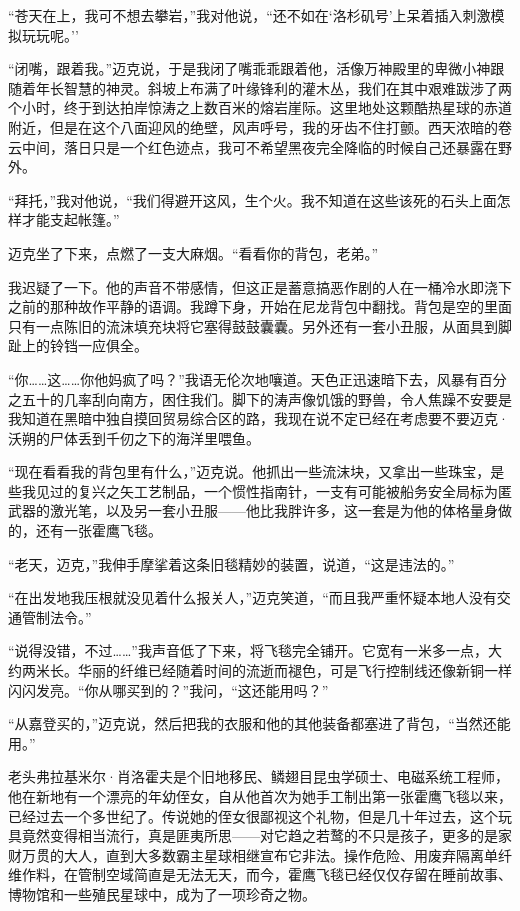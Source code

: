 \documentclass[AutoFakeBold=true]{book}
\begin{document}
``苍天在上，我可不想去攀岩，''我对他说，``还不如在`洛杉矶号'上呆着插入刺激模拟玩玩呢。''

``闭嘴，跟着我。''迈克说，于是我闭了嘴乖乖跟着他，活像万神殿里的卑微小神跟随着年长智慧的神灵。斜坡上布满了叶缘锋利的灌木丛，我们在其中艰难跋涉了两个小时，终于到达拍岸惊涛之上数百米的熔岩崖际。这里地处这颗酷热星球的赤道附近，但是在这个八面迎风的绝壁，风声呼号，我的牙齿不住打颤。西天浓暗的卷云中间，落日只是一个红色迹点，我可不希望黑夜完全降临的时候自己还暴露在野外。

``拜托，''我对他说，``我们得避开这风，生个火。我不知道在这些该死的石头上面怎样才能支起帐篷。''

迈克坐了下来，点燃了一支大麻烟。``看看你的背包，老弟。''

我迟疑了一下。他的声音不带感情，但这正是蓄意搞恶作剧的人在一桶冷水即浇下之前的那种故作平静的语调。我蹲下身，开始在尼龙背包中翻找。背包是空的里面只有一点陈旧的流沫填充块将它塞得鼓鼓囊囊。另外还有一套小丑服，从面具到脚趾上的铃铛一应俱全。

``你……这……你他妈疯了吗？''我语无伦次地嚷道。天色正迅速暗下去，风暴有百分之五十的几率刮向南方，困住我们。脚下的涛声像饥饿的野兽，令人焦躁不安要是我知道在黑暗中独自摸回贸易综合区的路，我现在说不定已经在考虑要不要迈克·沃朔的尸体丢到千仞之下的海洋里喂鱼。

``现在看看我的背包里有什么，''迈克说。他抓出一些流沫块，又拿出一些珠宝，是些我见过的复兴之矢工艺制品，一个惯性指南针，一支有可能被船务安全局标为匿武器的激光笔，以及另一套小丑服——他比我胖许多，这一套是为他的体格量身做的，还有一张霍鹰飞毯。

``老天，迈克，''我伸手摩挲着这条旧毯精妙的装置，说道，``这是违法的。''

``在出发地我压根就没见着什么报关人，''迈克笑道，``而且我严重怀疑本地人没有交通管制法令。''

``说得没错，不过……''我声音低了下来，将飞毯完全铺开。它宽有一米多一点，大约两米长。华丽的纤维已经随着时间的流逝而褪色，可是飞行控制线还像新铜一样闪闪发亮。``你从哪买到的？''我问，``这还能用吗？''

``从嘉登买的，''迈克说，然后把我的衣服和他的其他装备都塞进了背包，``当然还能用。''

老头弗拉基米尔·肖洛霍夫是个旧地移民、鳞翅目昆虫学硕士、电磁系统工程师，他在新地有一个漂亮的年幼侄女，自从他首次为她手工制出第一张霍鹰飞毯以来，已经过去一个多世纪了。传说她的侄女很鄙视这个礼物，但是几十年过去，这个玩具竟然变得相当流行，真是匪夷所思——对它趋之若鹜的不只是孩子，更多的是家财万贯的大人，直到大多数霸主星球相继宣布它非法。操作危险、用废弃隔离单纤维作料，在管制空域简直是无法无天，而今，霍鹰飞毯已经仅仅存留在睡前故事、博物馆和一些殖民星球中，成为了一项珍奇之物。
\end{document}
